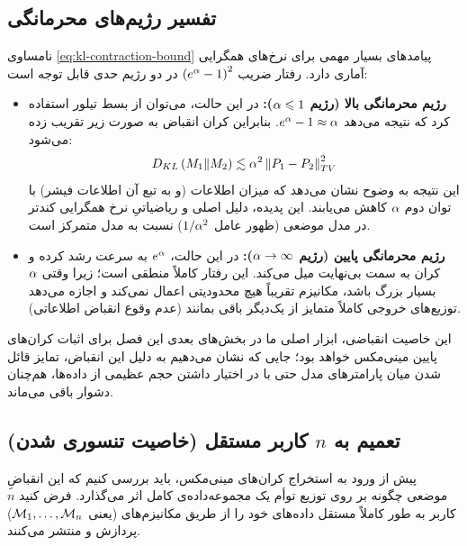 \subsection{تفسیر رژیم‌های محرمانگی}
نامساوی \eqref{eq:kl-contraction-bound} پیامدهای بسیار مهمی برای نرخ‌های همگرایی آماری دارد. رفتار ضریب $\left(e^{\alpha} - 1\right)^2$ در دو رژیم حدی قابل توجه است:

\begin{itemize}
    \item \textbf{رژیم محرمانگی بالا (رژیم $\alpha \leqslant 1$):}
    در این حالت، می‌توان از بسط تیلور استفاده کرد که نتیجه می‌دهد $e^{\alpha} - 1 \approx \alpha$. بنابراین کران انقباض به صورت زیر تقریب زده می‌شود:
    \begin{equation}
    D_{KL}\left(M_1 \| M_2\right) \lesssim \alpha^2 \left\lVert P_1 - P_2\right\rVert_{TV}^2
    \end{equation}
    این نتیجه به وضوح نشان می‌دهد که میزان اطلاعات (و به تبع آن اطلاعات فیشر) با توان دوم $\alpha$ کاهش می‌یابند. این پدیده، دلیل اصلی و ریاضیاتیِ نرخ همگرایی کندتر در مدل موضعی (ظهور عامل $1/\alpha^2$) نسبت به مدل متمرکز است.
    
    \item \textbf{رژیم محرمانگی پایین (رژیم $\alpha \to \infty$):}
    در این حالت، $e^{\alpha}$ به سرعت رشد کرده و کران به سمت بی‌نهایت میل می‌کند. این رفتار کاملاً منطقی است؛ زیرا وقتی $\alpha$ بسیار بزرگ باشد، مکانیزم \LDP تقریباً هیچ محدودیتی اعمال نمی‌کند و اجازه می‌دهد توزیع‌های خروجی کاملاً متمایز از یک‌دیگر باقی بمانند (عدم وقوع انقباض اطلاعاتی).
\end{itemize}

این خاصیت انقباضی، ابزار اصلی ما در بخش‌های بعدی این فصل برای اثبات کران‌های پایین مینی‌مکس خواهد بود؛ جایی که نشان می‌دهیم به دلیل این انقباض، تمایز قائل شدن میان پارامترهای مدل حتی با در اختیار داشتن حجم عظیمی از داده‌ها، هم‌چنان دشوار باقی می‌ماند.

\subsection{تعمیم به $n$ کاربر مستقل (خاصیت تنسوری شدن)}
\label{sec:minimax:tensorization}
پیش از ورود به استخراج کران‌های مینی‌مکس، باید بررسی کنیم که این انقباضِ موضعی چگونه بر روی توزیع توأم یک مجموعه‌داده‌ی کامل اثر می‌گذارد. فرض کنید $n$ کاربر به طور کاملاً مستقل داده‌های خود را از طریق مکانیزم‌های \LDP (یعنی $\mech_1, \dots, \mech_n$) پردازش و منتشر می‌کنند.


